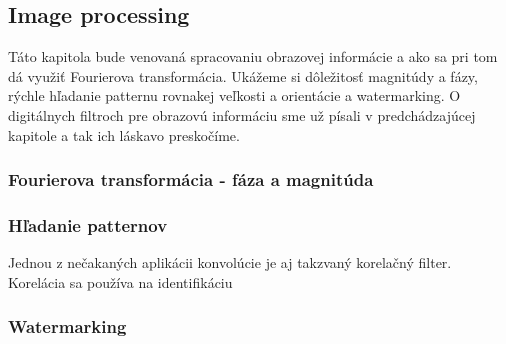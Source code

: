 \subsection{Image processing}

Táto kapitola bude venovaná spracovaniu obrazovej informácie a ako sa
pri tom dá využiť Fourierova transformácia. Ukážeme si dôležitosť
magnitúdy a fázy, rýchle hľadanie patternu rovnakej
veľkosti a orientácie a watermarking. O digitálnych filtroch pre
obrazovú informáciu sme už písali v predchádzajúcej kapitole a tak ich
láskavo preskočíme.

\subsubsection{Fourierova transformácia - fáza a magnitúda}


\subsubsection{Hľadanie patternov}
Jednou z nečakaných aplikácii konvolúcie je aj takzvaný korelačný
filter. Korelácia sa používa na identifikáciu

\subsubsection{Watermarking}
